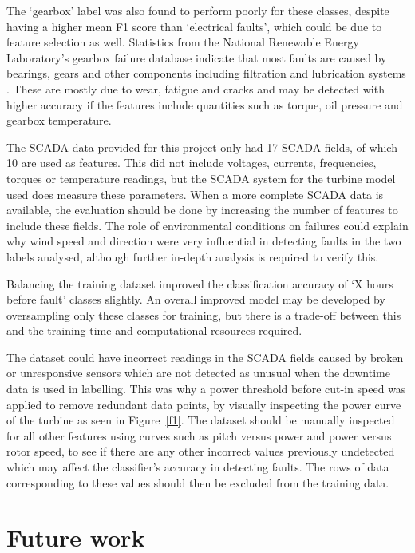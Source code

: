 The `gearbox' label was also found to perform poorly for these classes, despite having a higher mean F1 score than `electrical faults', which could be due to feature selection as well. Statistics from the National Renewable Energy Laboratory's gearbox failure database indicate that most faults are caused by bearings, gears and other components including filtration and lubrication systems \cite{Stati15}. These are mostly due to wear, fatigue and cracks \cite{Sheng11} and may be detected with higher accuracy if the features include quantities such as torque, oil pressure and gearbox temperature.

The SCADA data provided for this project only had 17 SCADA fields, of which 10 are used as features. This did not include voltages, currents, frequencies, torques or temperature readings, but the SCADA system for the turbine model used does measure these parameters. When a more complete SCADA data is available, the evaluation should be done by increasing the number of features to include these fields. The role of environmental conditions on failures could explain why wind speed and direction were very influential in detecting faults in the two labels analysed, although further in-depth analysis is required to verify this.

Balancing the training dataset improved the classification accuracy of `X hours before fault' classes slightly. An overall improved model may be developed by oversampling only these classes for training, but there is a trade-off between this and the training time and computational resources required.

The dataset could have incorrect readings in the SCADA fields caused by broken or unresponsive sensors which are not detected as unusual when the downtime data is used in labelling. This was why a power threshold before cut-in speed was applied to remove redundant data points, by visually inspecting the power curve of the turbine as seen in Figure~\ref{f1}. The dataset should be manually inspected for all other features using curves such as pitch versus power and power versus rotor speed, to see if there are any other incorrect values previously undetected which may affect the classifier's accuracy in detecting faults. The rows of data corresponding to these values should then be excluded from the training data.

\section{Future work}

